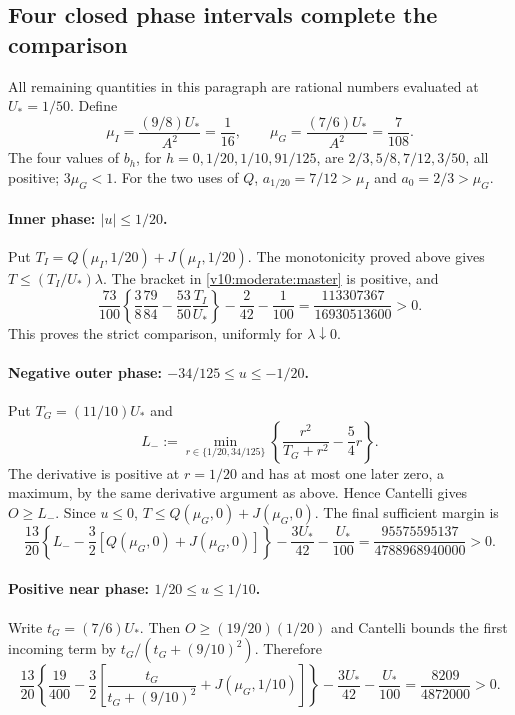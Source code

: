 \subsection{Four closed phase intervals complete the comparison}
All remaining quantities in this paragraph are rational numbers evaluated
at $U_*=1/50$. Define
\[
 \mu_I=\frac{(9/8)U_*}{A^2}=\frac1{16},\qquad
 \mu_G=\frac{(7/6)U_*}{A^2}=\frac7{108}.
\]
The four values of $b_h$, for $h=0,1/20,1/10,91/125$, are
$2/3,5/8,7/12,3/50$, all positive; $3\mu_G<1$.
For the two uses of $Q$, $a_{1/20}=7/12>\mu_I$ and
$a_0=2/3>\mu_G$.

\paragraph{Inner phase: $|u|\le1/20$.}
Put $T_I=Q(\mu_I,1/20)+J(\mu_I,1/20)$. The monotonicity proved
above gives $T\le(T_I/U_*)\lambda$. The bracket in
\eqref{v10:moderate:master} is positive, and
\[
 \frac{73}{100}\left\{\frac38\frac{79}{84}
              -\frac{53}{50}\frac{T_I}{U_*}\right\}
       -\frac2{42}-\frac1{100}
                 =\frac{113307367}{16930513600}>0.
\]
This proves the strict comparison, uniformly for $\lambda\downarrow0$.

\paragraph{Negative outer phase: $-34/125\le u\le-1/20$.}
Put $T_G=(11/10)U_*$ and
\[
 L_-:=\min_{r\in\{1/20,34/125\}}
               \left\{\frac{r^2}{T_G+r^2}-\frac54r\right\}.
\]
The derivative is positive at $r=1/20$ and has at most one later
zero, a maximum, by the same derivative argument as above. Hence
Cantelli gives $O\ge L_-$. Since $u\le0$,
$T\le Q(\mu_G,0)+J(\mu_G,0)$. The final sufficient margin is
\[
 \frac{13}{20}\left\{L_--\frac32[Q(\mu_G,0)+J(\mu_G,0)]\right\}
       -\frac{3U_*}{42}-\frac{U_*}{100}
             =\frac{95575595137}{4788968940000}>0.
\]

\paragraph{Positive near phase: $1/20\le u\le1/10$.}
Write $t_G=(7/6)U_*$. Then $O\ge(19/20)(1/20)$ and Cantelli
bounds the first incoming term by $t_G/(t_G+(9/10)^2)$. Therefore
\[
 \frac{13}{20}\left\{\frac{19}{400}
    -\frac32\left[\frac{t_G}{t_G+(9/10)^2}+J(\mu_G,1/10)\right]\right\}
       -\frac{3U_*}{42}-\frac{U_*}{100}
                    =\frac{8209}{4872000}>0.
\]

